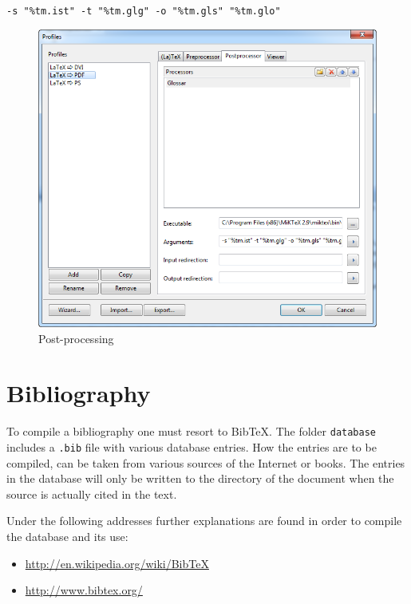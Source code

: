 \begin{center}
	\texttt{-s \string"\%tm.ist\string" -t \string"\%tm.glg\string" -o \string"\%tm.gls\string" \string"\%tm.glo\string" }
\end{center}

\begin{figure}[H]
	\centering
		\includegraphics[scale=0.6]{images/profiles_glossar.png}
	\caption{Post-processing}
	\label{fig:postprocessing}
\end{figure}


\section{Bibliography}
\label{sec:instructions_bibliography}

To compile a bibliography one must resort to \gls{BibTeX}. The folder \texttt{database} includes a \texttt{.bib} file with various database entries. How the entries are to be compiled, can be taken from various sources of the Internet or books. The entries in the database will only be written to the directory of the document when the source is actually cited in the text.

Under the following addresses further explanations are found in order to compile the database and its use:

\begin{itemize}
	\item \url{http://en.wikipedia.org/wiki/BibTeX}
	\item \url{http://www.bibtex.org/}
\end{itemize}


